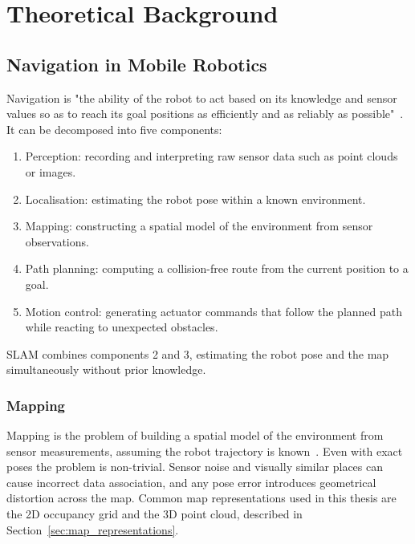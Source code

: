 \chapter{Theoretical Background}

\section{Navigation in Mobile Robotics}

Navigation is "the ability of the robot to act based on its knowledge
and sensor values so as to reach its goal positions as efficiently and as 
reliably as possible"~\cite[p.~257]{siegwart2004introduction}.
It can be decomposed into five components:

\begin{enumerate}
  \item Perception: recording and interpreting raw sensor data such
        as point clouds or images.
  \item Localisation: estimating the robot pose within a known environment.
  \item Mapping: constructing a spatial model of the environment
        from sensor observations.
  \item Path planning: computing a collision-free route from the
        current position to a goal.
  \item Motion control: generating actuator commands that follow
        the planned path while reacting to unexpected obstacles.
\end{enumerate}


SLAM combines components 2 and 3, estimating the robot pose and the
map simultaneously without prior knowledge.

\subsection{Mapping}

Mapping is the problem of building a spatial model of the environment from
sensor measurements, assuming the robot trajectory is
known~\cite[p.~221]{thrun2005probabilistic}.
Even with exact poses the problem is non-trivial. Sensor noise and visually
similar places can cause incorrect data association, and any pose error
introduces geometrical distortion across the map.
Common map representations used in this thesis are the 2D occupancy grid and
the 3D point cloud, described in Section~\ref{sec:map_representations}.

